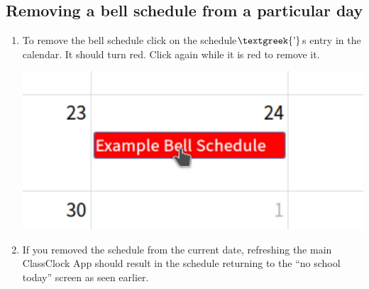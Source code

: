 \documentclass{article}
\begin{document}
\subsection{Removing a bell schedule from a particular day}
\begin{enumerate}
\item {To remove the bell schedule click on the schedule$\text{\textgreek{’}}$s entry in the calendar. It should turn red.
Click again while it is red to remove it.}
\begin{center}
\includegraphics[width=\textwidth]{Mini20Manual-img017.png}
\end{center}
\item {If you removed the schedule from the current date, refreshing the main ClassClock App should result in the schedule
returning to the “no school today” screen as seen earlier.}
\end{enumerate}
\end{document}
